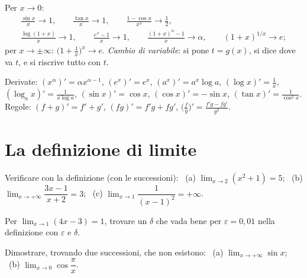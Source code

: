 \begin{vuoto}{}
Per $x\to0$:
\begin{gather*}
\frac{\sin x}x\to1,\qquad \frac{\tan x}x\to1,\qquad \frac{1-\cos x}{x^2}\to\frac12,\\
\frac{\log(1+x)}x\to1,\qquad \frac{e^x-1}x\to1,\qquad \frac{(1+x)^\alpha-1}x\to\alpha,\qquad (1+x)^{1/x}\to e;
\end{gather*}
per $x\to\pm\infty$: $\bigl(1+\frac1x\bigr)^x\to e$. \emph{Cambio di variabile}: si pone $t=g(x)$, si dice dove va $t$, e si riscrive tutto con $t$.

Derivate: $(x^\alpha)'=\alpha x^{\alpha-1}$, $(e^x)'=e^x$, $(a^x)'=a^x\log a$, $(\log x)'=\frac1x$, $(\log_ax)'=\frac1{x\log a}$, $(\sin x)'=\cos x$, $(\cos x)'=-\sin x$, $(\tan x)'=\frac1{\cos^2x}$. Regole: $(f+g)'=f'+g'$, $(fg)'=f'g+fg'$, $\bigl(\frac fg\bigr)'=\frac{f'g-fg'}{g^2}$.
\end{vuoto}

\section{La definizione di limite}

\begin{esercizio}[\liv{1}]
Verificare con la definizione (con le successioni): \ (a) $\lim_{x\to2}(x^2+1)=5$; \ (b) $\lim_{x\to+\infty}\dfrac{3x-1}{x+2}=3$; \ (c) $\lim_{x\to1}\dfrac1{(x-1)^2}=+\infty$.
\end{esercizio}

\begin{esercizio}[\liv{1}]
Per $\lim_{x\to1}(4x-3)=1$, trovare un $\delta$ che vada bene per $\varepsilon=0{,}01$ nella definizione con $\varepsilon$ e $\delta$.
\end{esercizio}

\begin{esercizio}[\liv{2}]
Dimostrare, trovando due successioni, che non esistono: \ (a) $\lim_{x\to+\infty}\sin x$; \ (b) $\lim_{x\to0}\cos\dfrac\pi x$.
\end{esercizio}

